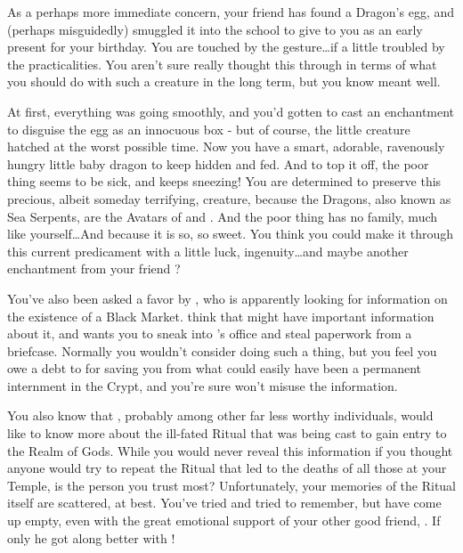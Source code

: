 \documentclass[char]{GL2020}
\begin{document}
As a perhaps more immediate concern, your friend \cPirateChild{} has found a Dragon’s egg, and (perhaps misguidedly) smuggled it into the school to give to you as an early present for your birthday. You are touched by the gesture\ldots if a little troubled by the practicalities. You aren’t sure \cPirateChild{} really thought this through in terms of what you should do with such a creature in the long term, but you know \cPirateChild{\they} meant well. 

At first, everything was going smoothly, and you’d gotten \cAdopted{} to cast an enchantment to disguise the egg as an innocuous box - but of course, the little creature hatched at the worst possible time. Now you have a smart, adorable, ravenously hungry little baby dragon to keep hidden and fed. And to top it off, the poor thing seems to be sick, and keeps sneezing! You are determined to preserve this precious, albeit someday terrifying, creature, because the Dragons, also known as Sea Serpents, are the Avatars of \cEbbFull{} and \cFlowFull{}. And the poor thing has no family, much like yourself\ldots And because it is so, so sweet. You think you could make it through this current predicament with a little luck, ingenuity\ldots and maybe another enchantment from your friend \cAdopted{}?

You’ve also been asked a favor by \cWildCard{}, who is apparently looking for information on the existence of a Black Market. \cWildCard{\they} think\cWildCard{\plural} that \cBunker{} might have important information about it, and \cWildCard{\they} wants you to sneak into \cBunker{}’s office and steal paperwork from a briefcase. Normally you wouldn’t consider doing such a thing, but you feel you owe a debt to \cWildCard{} for saving you from what could easily have been a permanent internment in the Crypt, and you’re sure \cWildCard{\they} won’t misuse the information.

You also know that \cWildCard{}, probably among other far less worthy individuals, would like to know more about the ill-fated Ritual that was being cast to gain entry to the Realm of Gods. While you would never reveal this information if you thought anyone would try to repeat the Ritual that led to the deaths of all those at your Temple, \cWildCard{} is the person you trust most? Unfortunately, your memories of the Ritual itself are scattered, at best. You’ve tried and tried to remember, but have come up empty, even with the great emotional support of your other good friend, \cTechStar{}. If only he got along better with \cWildCard{}!
\end{document}
